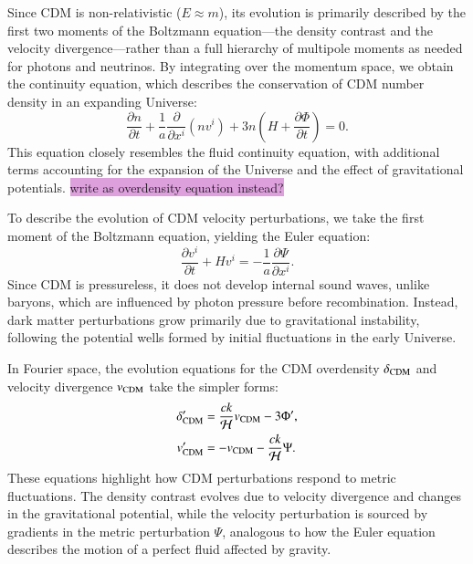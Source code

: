 \documentclass{aa}
\numberwithin{equation}{section}
\numberwithin{table}{section}
\numberwithin{figure}{section}
\begin{document}
Since CDM is non-relativistic ($E \approx m$), its evolution is primarily described by the first two moments of the Boltzmann equation—the density contrast and the velocity divergence—rather than a full hierarchy of multipole moments as needed for photons and neutrinos. By integrating over the momentum space, we obtain the continuity equation, which describes the conservation of CDM number density in an expanding Universe:
\begin{equation}
\frac{\partial n}{\partial t} + \frac{1}{a} \frac{\partial}{\partial x^i} \left(n v^i\right) + 3 n \left(H + \frac{\partial \Phi}{\partial t} \right) = 0.
\end{equation}
This equation closely resembles the fluid continuity equation, with additional terms accounting for the expansion of the Universe and the effect of gravitational potentials. \colorbox{Plum}{write as overdensity equation instead?}

To describe the evolution of CDM velocity perturbations, we take the first moment of the Boltzmann equation, yielding the Euler equation:
\begin{equation}
\frac{\partial v^i}{\partial t} + H v^i = -\frac{1}{a} \frac{\partial \Psi}{\partial x^i}.
\end{equation}
Since CDM is pressureless, it does not develop internal sound waves, unlike baryons, which are influenced by photon pressure before recombination. Instead, dark matter perturbations grow primarily due to gravitational instability, following the potential wells formed by initial fluctuations in the early Universe.

In Fourier space, the evolution equations for the CDM overdensity $\delta_{\rm CDM}$ and velocity divergence $v_{\rm CDM}$ take the simpler forms:
\begin{align}
\delta_{\rm CDM}' &= \frac{c k}{\mathcal{H}} v_{\rm CDM} - 3 \Phi', \\
v_{\rm CDM}' &= - v_{\rm CDM} - \frac{c k}{\mathcal{H}} \Psi.
\end{align}
These equations highlight how CDM perturbations respond to metric fluctuations. The density contrast evolves due to velocity divergence and changes in the gravitational potential, while the velocity perturbation is sourced by gradients in the metric perturbation $\Psi$, analogous to how the Euler equation describes the motion of a perfect fluid affected by gravity. 

\end{document}
